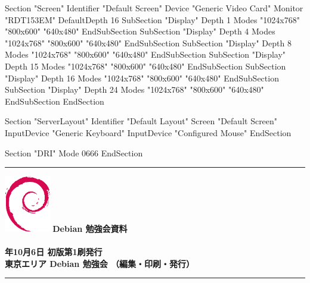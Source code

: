 \documentclass[mingoth,a4paper]{jsarticle}
\newcommand{\debmtgyear}{2007}
\newcommand{\debmtgdate}{6}
\newcommand{\debmtgmonth}{10}
\begin{document}
\begin{commandline}
Section "Screen"
	Identifier	"Default Screen"
	Device		"Generic Video Card"
	Monitor		"RDT153EM"
	DefaultDepth	16
	SubSection "Display"
		Depth		1
		Modes		"1024x768" "800x600" "640x480"
	EndSubSection
	SubSection "Display"
		Depth		4
		Modes		"1024x768" "800x600" "640x480"
	EndSubSection
	SubSection "Display"
		Depth		8
		Modes		"1024x768" "800x600" "640x480"
	EndSubSection
	SubSection "Display"
		Depth		15
		Modes		"1024x768" "800x600" "640x480"
	EndSubSection
	SubSection "Display"
		Depth		16
		Modes		"1024x768" "800x600" "640x480"
	EndSubSection
	SubSection "Display"
		Depth		24
		Modes		"1024x768" "800x600" "640x480"
	EndSubSection
EndSection

Section "ServerLayout"
	Identifier	"Default Layout"
	Screen		"Default Screen"
	InputDevice	"Generic Keyboard"
	InputDevice	"Configured Mouse"
EndSection

Section "DRI"
	Mode	0666
EndSection
\end{commandline}


\cleartooddpage

\begin{minipage}[b]{0.2\hsize}
 \colorbox{dancerlightblue}{}
\end{minipage}
\begin{minipage}[b]{0.8\hsize}

\vspace*{15cm}
{\color{dancerlightblue}\rule{\hsize}{1mm}}
\vspace{2mm}
\includegraphics[width=2cm]{image200502/openlogo-nd.eps}
\noindent \Large \bf Debian 勉強会資料\\ \\
\noindent \normalfont \debmtgyear{}年\debmtgmonth{}月\debmtgdate{}日 \hspace{5mm}  初版第1刷発行\\
\noindent \normalfont 東京エリア Debian 勉強会 （編集・印刷・発行）\\
{\color{dancerdarkblue}\rule{\hsize}{1mm}}
\end{minipage}
\end{document}
